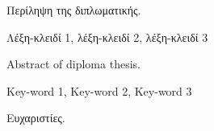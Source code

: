 \begin{abstractgr}
	Περίληψη της διπλωματικής.
\begin{keywordsgr}
  	Λέξη-κλειδί 1, λέξη-κλειδί 2, λέξη-κλειδί 3
\end{keywordsgr}
\end{abstractgr}

\begin{abstracten}
	Abstract of diploma thesis.
\begin{keywordsen}
  	Key-word 1, Key-word 2, Key-word 3
\end{keywordsen}
\end{abstracten}

\begin{acknowledgementsgr}
	Ευχαριστίες.
\end{acknowledgementsgr}



